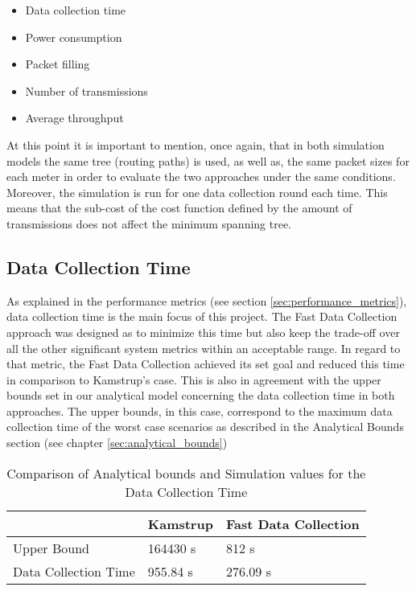\begin{itemize}
\item Data collection time
\item Power consumption
\item Packet filling
\item Number of transmissions
\item Average throughput
\end{itemize}

At this point it is important to mention, once again, that in both simulation models the same tree (routing paths) is used, as well as, the same packet sizes for each meter in order to evaluate the two approaches under the same conditions. Moreover, the simulation is run for one data collection round each time. This means that the sub-cost of the cost function defined by the amount of transmissions does not affect the minimum spanning tree.

\subsection{Data Collection Time}
As explained in the performance metrics (see section \ref{sec:performance_metrics}), data collection time is the main focus of this project. The Fast Data Collection approach was designed as to minimize this time but also keep the trade-off over all the other significant system metrics within an acceptable range. In regard to that metric, the Fast Data Collection achieved its set goal and reduced this time in comparison to Kamstrup's case. This is also in agreement with the upper bounds set in our analytical model concerning the data collection time in both approaches. The upper bounds, in this case, correspond to the maximum data collection time of the worst case scenarios as described in the Analytical Bounds section (see chapter \ref{sec:analytical_bounds})

\begin{table}[H]
\begin{center}
    \begin{tabular}{ | l | l | l |}
    \hline
    & Kamstrup & Fast Data Collection \\ \hline
    Upper Bound & 164430 s & 812 s \\ \hline
    Data Collection Time & 955.84 s & 276.09 s \\ \hline
    \end{tabular}
\end{center}
\caption{Comparison of Analytical bounds and Simulation values for the Data Collection Time}
\label{tab:data_collection_time}
\end{table}

